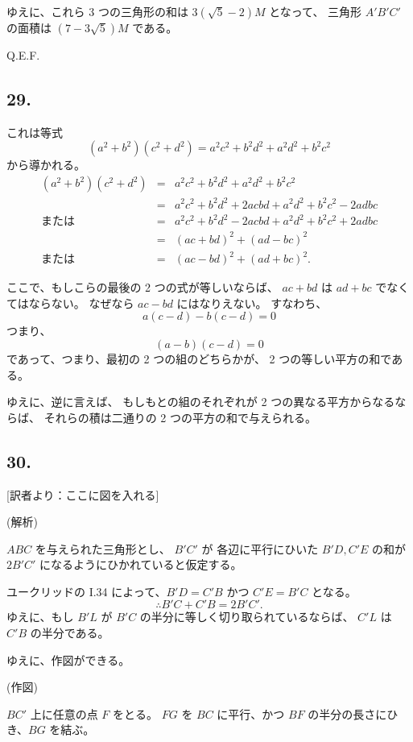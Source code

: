 ゆえに、これら 3 つの三角形の和は $3(\sqrt{5} - 2)M$ となって、
三角形 $A'B'C'$ の面積は $(7 - 3\sqrt{5})M$ である。

Q.E.F.

\subsection*{29.}

これは等式
\[
(a^2 + b^2)(c^2 + d^2) = a^2 c^2 + b^2 d^2 + a^2 d^2 + b^2 c^2
\]
から導かれる。
\begin{eqnarray*}
(a^2 + b^2)(c^2 + d^2) &=& a^2 c^2 + b^2 d^2 + a^2 d^2 + b^2 c^2\\
              &=& a^2 c^2 + b^2 d^2 + 2acbd + a^2 d^2 + b^2 c^2 - 2adbc\\
\mbox{または} &=& a^2 c^2 + b^2 d^2 - 2acbd + a^2 d^2 + b^2 c^2 + 2adbc\\
              &=& (ac + bd)^2 + (ad - bc)^2\\
\mbox{または} &=&  (ac - bd)^2 + (ad + bc)^2.
\end{eqnarray*}

ここで、もしこらの最後の 2 つの式が等しいならば、
$ac + bd$ は $ad + bc$ でなくてはならない。
なぜなら $ac - bd$ にはなりえない。
すなわち、
\[
a(c - d) - b(c - d) = 0
\]
つまり、
\[
(a - b)(c - d)  = 0
\]
であって、つまり、最初の 2 つの組のどちらかが、
 2 つの等しい平方の和である。

ゆえに、逆に言えば、
もしもとの組のそれぞれが 2 つの異なる平方からなるならば、
それらの積は二通りの 2 つの平方の和で与えられる。

\subsection*{30.}

[訳者より：ここに図を入れる]

(解析)

$ABC$ を与えられた三角形とし、
$B'C'$ が 各辺に平行にひいた $B'D, C'E$
の和が $2B'C'$ になるようにひかれていると仮定する。

ユークリッドの I.34 によって、$B'D = C'B$ かつ $C'E=B'C$ となる。
\[
\therefore
B'C  + C'B = 2B'C'.
\]
ゆえに、もし $B'L$ が $B'C$ の半分に等しく切り取られているならば、
$C'L$ は $C'B$ の半分である。

ゆえに、作図ができる。

(作図)

$BC'$ 上に任意の点 $F$ をとる。
$FG$ を $BC$ に平行、かつ $BF$ の半分の長さにひき、$BG$ を結ぶ。

